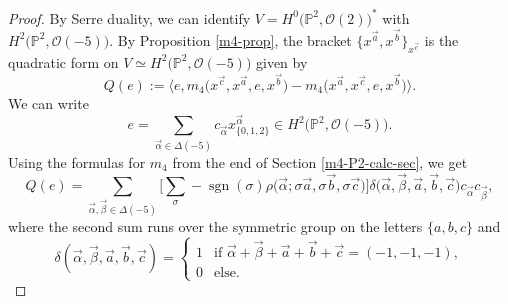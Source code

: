 \documentclass[10pt,a4paper]{amsart}
\numberwithin{equation}{section}
\renewcommand{\P}{{\mathbb P}}
\newcommand{\OO}{{\mathcal O}}
\begin{document}
\begin{proof}
By Serre duality, we can identify $V=H^0\big(\P^2,\OO(2)\big)^*$ with $H^2\big(\P^2,\OO(-5)\big)$.
By Proposition \ref{m4-prop}, the bracket $\{x^{\vec{a}},x^{\vec{b}}\}_{x^{\vec{c}}}$ is the quadratic form on $V\simeq H^2\big(\P^2,\OO(-5)\big)$ given by
\[
Q(e):=\big\langle e,m_4\big(x^{\vec{c}},x^{\vec{a}},e,x^{\vec{b}}\big)-m_4\big(x^{\vec{a}},x^{\vec{c}},e,x^{\vec{b}}\big)\big\rangle.
\]
We can write
\[
e=\sum_{\vec{\alpha}\in \Delta(-5)}c_{\vec{\alpha}}x^{\vec{\alpha}}_{\{0,1,2\}}\in H^2\big(\P^2,\OO(-5)\big).
\]
Using the formulas for $m_4$ from the end of Section \ref{m4-P2-calc-sec},
we get
	\[
Q(e)=\sum_{\vec{\alpha},\vec{\beta}\in \Delta(-5)}\bigg[\sum_{\sigma}-\operatorname{sgn}(\sigma)\rho\big(\vec{\alpha};\sigma\vec{a},\sigma\vec{b},\sigma\vec{c}\big)\bigg]\delta\big(\vec{\alpha},\vec{\beta},\vec{a},\vec{b},\vec{c}\big)c_{\vec{\alpha}}c_{\vec{\beta}},
\]
	where the second sum runs over the symmetric group on the letters $\{a,b,c\}$ and
	\[
\delta(\vec{\alpha},\vec{\beta},\vec{a},\vec{b},\vec{c})=\begin{cases}
		1 & \text{if }\vec{\alpha}+\vec{\beta}+\vec{a}+\vec{b}+\vec{c}=(-1,-1,-1),\\
		0 & \text{else}.
	\end{cases}
\]


\end{proof}
\end{document}
